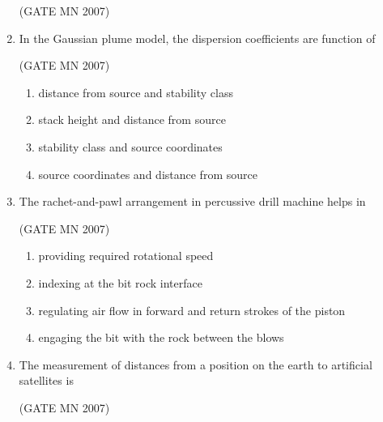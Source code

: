 \documentclass[journal]{IEEEtran}
\begin{document}
\begin{enumerate}
	   \hfill (GATE MN 2007)
\begin{enumerate}
\end{enumerate}


\item In the Gaussian plume model, the dispersion coefficients are function of


	\hfill (GATE MN 2007)
\begin{enumerate}
		
    \item distance from source and stability class
    \item stack height and distance from source
    \item stability class and source coordinates
    \item source coordinates and distance from source
	    
\end{enumerate}


\item The rachet-and-pawl arrangement in percussive drill machine helps in


	\hfill (GATE MN 2007)
\begin{enumerate}
		
		
    \item providing required rotational speed
    \item indexing at the bit rock interface
    \item regulating air flow in forward and return strokes of the piston
    \item engaging the bit with the rock between the blows
	    
\end{enumerate}


\item The measurement of distances from a position on the earth to artificial satellites is


	\hfill (GATE MN 2007)
\begin{enumerate}
		
\end{enumerate}



\end{enumerate}
\end{document}
